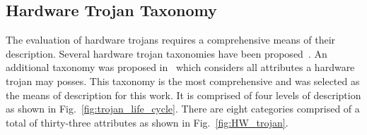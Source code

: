 \documentclass[journal, hidelinks]{IEEEtran}
\begin{document}
\subsection{Hardware Trojan Taxonomy} \label{sec:taxonomy}
The evaluation of hardware trojans requires a comprehensive means of their description.
Several hardware trojan taxonomies have been proposed~\cite{taxonomy1, taxonomy2, taxonomy3, taxonomy4}.
An additional taxonomy was proposed in~\cite{samerAttribute} which considers all attributes a hardware trojan may posses.
This taxonomy is the most comprehensive and was selected as the means of description for this work.
It is comprised of four levels of description as shown in Fig.~\ref{fig:trojan_life_cycle}.
There are eight categories comprised of a total of thirty-three attributes as shown in Fig.~\ref{fig:HW_trojan}.
\end{document}
